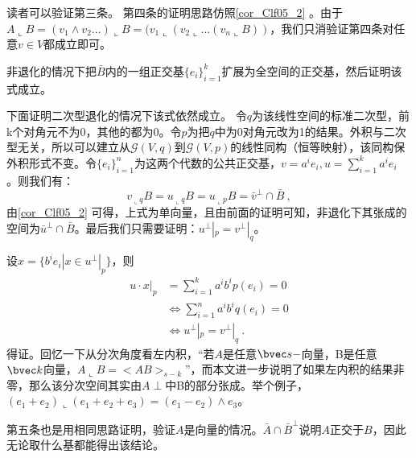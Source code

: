 读者可以验证第三条。
第四条的证明思路仿照\autoref{cor_Clf05_2} 。由于$A\llcorner B=(v_1\wedge v_2...)\llcorner B=(v_1\llcorner (v_2\llcorner...(v_n\llcorner B))$，我们只消验证第四条对任意$v\in V$都成立即可。

非退化的情况下把$\bar B$内的一组正交基$\{e_i\}^k_{i=1}$扩展为全空间的正交基，然后证明该式成立。

下面证明二次型退化的情况下该式依然成立。
令$q$为该线性空间的标准二次型，前k个对角元不为0，其他的都为0。令$p$为把$q$中为0对角元改为1的结果。外积与二次型无关，所以可以建立从$\mathcal G(V,q)$到$\mathcal G(V,p)$的线性同构（恒等映射），该同构保外积形式不变。令$\{e_i\}^n_{i=1}$为这两个代数的公共正交基，$v=a^ie_i,u=\sum \limits ^k_{i=1}a^ie_i$ 。则我们有：
\begin{equation}
v_{\llcorner q} B=u_{\llcorner q}B=u_{\llcorner p}B=\bar{v}^{\perp} \cap \bar{B}~,
\end{equation}
由\autoref{cor_Clf05_2} 可得，上式为单向量，且由前面的证明可知，非退化下其张成的空间为$\bar u^{\perp}\cap\bar B$。最后我们只需要证明：$u^{\perp}|_p=v^{\perp}|_q$。

设$x=\{b^ie_i|x\in u^{\perp}|_p\}$，则
\begin{equation}
\begin{aligned}
u\cdot x|_p&=\sum \limits^k_{i=1}a^i b^i p(e_i)=0\\
& \Leftrightarrow \sum \limits^n_{i=1}a^i b^i q(e_i)=0\\
& \Leftrightarrow u^{\perp}|_p=v^{\perp}|_q~.
\end{aligned}
\end{equation}
得证。回忆一下从分次角度看左内积，“若$A$是任意$\bvec s-$向量，B是任意$\bvec k$向量，$A\llcorner B=<AB>_{s-k}$”，而本文进一步说明了如果左内积的结果非零，那么该分次空间其实由$A\perp$中B的部分张成。举个例子，$(e_1+e_2)\llcorner (e_1+e_2+e_3)=(e_1-e_2)\wedge e_3$。

第五条也是用相同思路证明，验证$A$是向量的情况。$\bar A \cap \bar B^{\perp}$说明$A$正交于$B$，因此无论取什么基都能得出该结论。